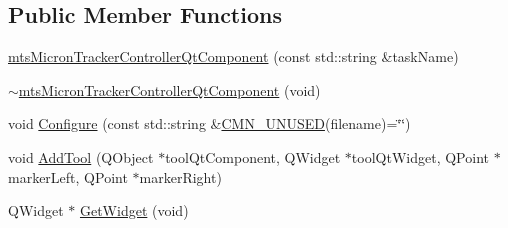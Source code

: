 \subsection*{Public Member Functions}
\begin{DoxyCompactItemize}
\item 
\hyperlink{classmts_micron_tracker_controller_qt_component_aac0e38ca9caced66a923669ca69e4ee1}{mts\-Micron\-Tracker\-Controller\-Qt\-Component} (const std\-::string \&task\-Name)
\item 
\hyperlink{classmts_micron_tracker_controller_qt_component_a0937bfd4d0acfa21bbb3a298e55c5f5e}{$\sim$mts\-Micron\-Tracker\-Controller\-Qt\-Component} (void)
\item 
void \hyperlink{classmts_micron_tracker_controller_qt_component_aecb249c8f83d2127298877585dcf0084}{Configure} (const std\-::string \&\hyperlink{cmn_portability_8h_a021894e2626935fa2305434b1e893ff6}{C\-M\-N\-\_\-\-U\-N\-U\-S\-E\-D}(filename)=\char`\"{}\char`\"{})
\item 
void \hyperlink{classmts_micron_tracker_controller_qt_component_a940b3d0e9a62b0231de067aea6b12f6d}{Add\-Tool} (Q\-Object $\ast$tool\-Qt\-Component, Q\-Widget $\ast$tool\-Qt\-Widget, Q\-Point $\ast$marker\-Left, Q\-Point $\ast$marker\-Right)
\item 
Q\-Widget $\ast$ \hyperlink{classmts_micron_tracker_controller_qt_component_a35826c5cef11e71a5485a3d409a1cb4e}{Get\-Widget} (void)
\end{DoxyCompactItemize}
